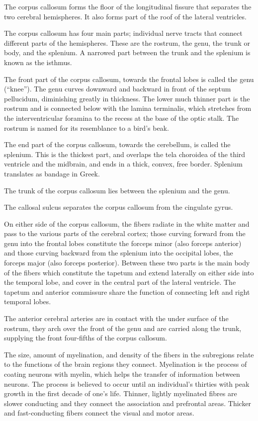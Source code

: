 The corpus callosum forms the floor of the longitudinal fissure that separates the two cerebral hemispheres. It also forms part of the roof of the lateral ventricles.

The corpus callosum has four main parts; individual nerve tracts that connect different parts of the hemispheres. These are the rostrum, the genu, the trunk or body, and the splenium. A narrowed part between the trunk and the splenium is known as the isthmus.

The front part of the corpus callosum, towards the frontal lobes is called the genu (``knee''). The genu curves downward and backward in front of the septum pellucidum, diminishing greatly in thickness. The lower much thinner part is the rostrum and is connected below with the lamina terminalis, which stretches from the interventricular foramina to the recess at the base of the optic stalk. The rostrum is named for its resemblance to a bird's beak.

The end part of the corpus callosum, towards the cerebellum, is called the splenium. This is the thickest part, and overlaps the tela choroidea of the third ventricle and the midbrain, and ends in a thick, convex, free border. Splenium translates as bandage in Greek.

The trunk of the corpus callosum lies between the splenium and the genu.

The callosal sulcus separates the corpus callosum from the cingulate gyrus.

On either side of the corpus callosum, the fibers radiate in the white matter and pass to the various parts of the cerebral cortex; those curving forward from the genu into the frontal lobes constitute the forceps minor (also forceps anterior) and those curving backward from the splenium into the occipital lobes, the forceps major (also forceps posterior). Between these two parts is the main body of the fibers which constitute the tapetum and extend laterally on either side into the temporal lobe, and cover in the central part of the lateral ventricle. The tapetum and anterior commissure share the function of connecting left and right temporal lobes.

The anterior cerebral arteries are in contact with the under surface of the rostrum, they arch over the front of the genu and are carried along the trunk, supplying the front four-fifths of the corpus callosum.

The size, amount of myelination, and density of the fibers in the subregions relate to the functions of the brain regions they connect. Myelination is the process of coating neurons with myelin, which helps the transfer of information between neurons. The process is believed to occur until an individual's thirties with peak growth in the first decade of one's life. Thinner, lightly myelinated fibres are slower conducting and they connect the association and prefrontal areas. Thicker and fast-conducting fibers connect the visual and motor areas.

